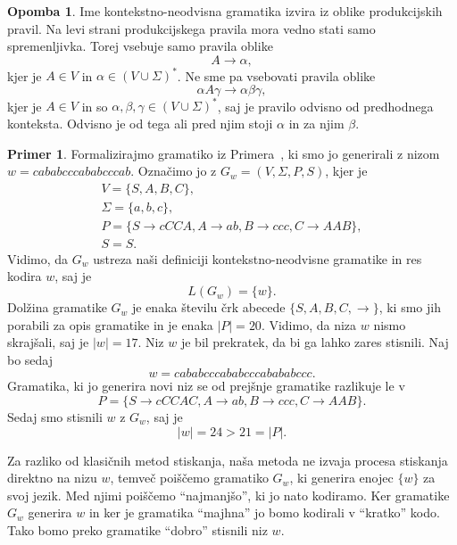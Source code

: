 \documentclass{amsart}
\theoremstyle{definition}
\newtheorem{primer}[definicija]{Primer}
\newtheorem{opomba}[definicija]{Opomba}
\theoremstyle{plain} %
\begin{document}
\begin{opomba}
    
    Ime kontekstno-neodvisna gramatika izvira iz oblike produkcijskih pravil. Na levi
    strani produkcijskega pravila mora vedno stati samo spremenljivka. Torej vsebuje samo
    pravila oblike
    \[
        A \rightarrow \alpha,
    \]
    kjer je  $ A \in V $ in $ \alpha \in ( V \cup \Sigma )^* $. Ne sme pa vsebovati
    pravila oblike
    \[
        \alpha A \gamma \rightarrow \alpha\beta\gamma,
    \]
    kjer je $ A \in V $ in so $ \alpha, \beta, \gamma \in ( V \cup \Sigma )^* $, saj je
    pravilo odvisno od predhodnega konteksta. Odvisno je od tega ali pred njim stoji $ \alpha $
    in za njim $ \beta $.

\end{opomba}

\begin{primer}
    
    Formalizirajmo gramatiko iz Primera~, ki smo jo generirali z nizom
    $ w = \mathit{cababcccababcccab} $. Označimo jo z $ G_w = ( V, \Sigma, P, S ) $, kjer je 
    \begin{gather*}
        V = \{ S, A, B, C \}, \\
        \Sigma = \{ a, b, c \}, \\
        P = \{ S  \rightarrow  \mathit{cCCA}, A  \rightarrow  \mathit{ab}, B  
        \rightarrow  \mathit{ccc}, C  \rightarrow  \mathit{AAB} \}, \\
        S = S.
    \end{gather*}
    Vidimo, da $ G_w $ ustreza naši definiciji kontekstno-neodvisne gramatike
    in res kodira $ w $, saj je 
    \[
        L(G_w) = \{w\}.
    \]
    Dolžina gramatike $ G_w $ je enaka številu črk abecede $ \{ S, A, B, C, \rightarrow \} $,
    ki smo jih porabili za opis gramatike in je enaka $ |P| = 20 $. Vidimo, da niza $ w $ 
    nismo skrajšali, saj je $ |w| = 17 $. Niz $ w $ je bil prekratek, da bi ga lahko
    zares stisnili. Naj bo sedaj
    \[
        w =   \mathit{cababcccababcccabababccc}.
    \]
    Gramatika, ki jo generira novi niz se od prejšnje gramatike razlikuje le v
    \[
        P = \{ S  \rightarrow  cCCAC, A  \rightarrow  ab, B  
        \rightarrow  ccc, C  \rightarrow  AAB \}.
    \]
    Sedaj smo stisnili $ w $ z $ G_w $, saj je
    \[
        |w| = 24 > 21 = |P|.
    \]

\end{primer}

Za razliko od klasičnih metod stiskanja, naša metoda ne izvaja procesa stiskanja
direktno na nizu $ w $, temveč poiščemo gramatiko $ G_w $, ki generira 
enojec $ \{ w \} $ za svoj jezik. Med njimi poiščemo ``najmanjšo'', ki jo nato kodiramo.
Ker gramatike $ G_w $ generira $ w $ in ker je gramatika ``majhna'' jo bomo kodirali v 
``kratko'' kodo. Tako bomo preko gramatike ``dobro'' stisnili niz $ w $.
\end{document}

